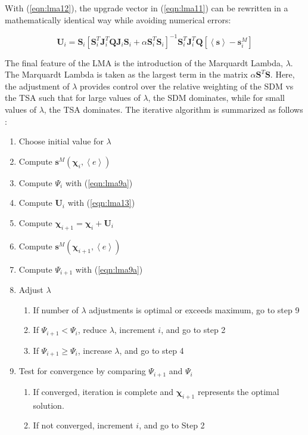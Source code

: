 With (\ref{eqn:lma12}), the upgrade vector in (\ref{eqn:lma11}) can be rewritten in a mathematically identical way while avoiding numerical errors:


\begin{equation}
\mathbf{U}_i= \mathbf{S}_i\left[\mathbf{S}_i^T\mathbf{J}_i^T\mathbf{Q}\mathbf{J}_i\mathbf{S}_i+\alpha\mathbf{S}_i^T\mathbf{S}_i\right]^{-1}\mathbf{S}_i^T\mathbf{J}_i^T\mathbf{Q}\left[\left<\mathbf{s}\right>-\mathbf{s}^M_i\right]
\label{eqn:lma13}
\end{equation}

The final feature of the LMA is the introduction of the Marquardt Lambda, $\lambda$. The Marquardt Lambda is taken as the largest term in the matrix $\alpha\mathbf{S}^T\mathbf{S}$. Here, the adjustment of $\lambda$ provides control over the relative weighting of the SDM vs the TSA such that for large values of $\lambda$, the SDM dominates, while for small values of $\lambda$, the TSA dominates. The iterative algorithm is summarized as follows \cite{matott_ostrich:_2008}:

\begin{enumerate}
\item Choose initial value for $\lambda$
\item Compute $\mathbf{s}^M \left(\boldsymbol{\chi}_i, \left< e \right>\right)$
\item Compute $\Psi_i$ with (\ref{eqn:lma9a})
\item Compute $\mathbf{U}_i$ with (\ref{eqn:lma13})
\item Compute $\boldsymbol{\chi}_{i+1}=\boldsymbol{\chi}_i+\mathbf{U}_i$
\item Compute $\mathbf{s}^M \left(\boldsymbol{\chi}_{i+1}, \left< e \right>\right)$
\item Compute $\Psi_{i+1}$ with (\ref{eqn:lma9a})
\item Adjust $\lambda$
\begin{enumerate}
\item If number of $\lambda$ adjustments is optimal or exceeds maximum, go to step 9
\item If $\Psi_{i+1} < \Psi_i$, reduce $\lambda$, increment $i$, and go to step 2
\item If $\Psi_{i+1} \geq \Psi_i$, increase $\lambda$, and go to step 4
\end{enumerate}
\item Test for convergence by comparing $\Psi_{i+1}$ and $\Psi_i$
\begin{enumerate}
\item If converged, iteration is complete and $\boldsymbol{\chi}_{i+1}$ represents the optimal solution.
\item If not converged, increment $i$, and go to Step 2
\end{enumerate}
\end{enumerate}


